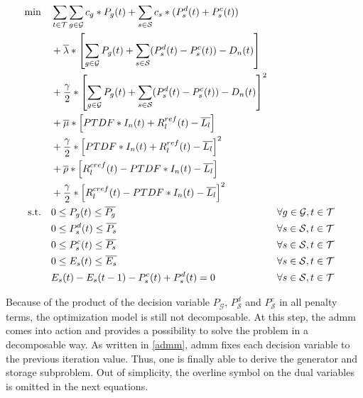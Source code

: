 \begin{subequations}
	\begin{align}
		 \min \quad & \sum_{t\in\mathcal{T}}\sum_{g\in\mathcal{G}}c_g*P_g(t) + \sum_{s\in\mathcal{S}}c_s*(P_s^d(t)+P_s^c(t)) \label{eq:dom:final} \\
		 & + \overline{\lambda} * \left[\sum_{g\in\mathcal{G}}P_g(t) + \sum_{s\in\mathcal{S}}(P_s^d(t)-P_s^c(t))-D_n(t)\right]\nonumber \\
		 & + \frac{\gamma}{2} * \left[\sum_{g\in\mathcal{G}}P_g(t) + \sum_{s\in\mathcal{S}}(P_s^d(t)-P_s^c(t))-D_n(t)\right]^2 \nonumber \\
		 & + \overline{\mu} * \left[PTDF * I_n(t) + R^{ref}_l(t) - \overline{L_l}\right] \nonumber \\
		 & + \frac{\gamma}{2} * \left[PTDF * I_n(t) + R^{ref}_l(t) - \overline{L_l}\right]^2 \nonumber \\
		 & + \overline{\rho} * \left[R^{cref}_l(t) - PTDF * I_n(t) - \overline{L_l}\right]\nonumber \\
		 & + \frac{\gamma}{2} * \left[R^{cref}_l(t) - PTDF * I_n(t) - \overline{L_l}\right]^2\nonumber \\
		 \text{s.t.} \quad & 0 \leq P_g(t) \leq \overline{P_g} && \forall g \in \mathcal{G}, t \in \mathcal{T}\\\
		 & 0 \leq P_s^d(t) \leq \overline{P_s} && \forall s \in \mathcal{S}, t \in \mathcal{T}\\
		 & 0 \leq P_s^c(t) \leq \overline{P_s} && \forall s \in \mathcal{S}, t \in \mathcal{T}\\
		 & 0 \leq E_s(t) \leq \overline{E_s} && \forall s \in \mathcal{S}, t \in \mathcal{T}\\
		 & E_s(t) - E_s(t-1) - P_s^c(t) + P_s^d(t) = 0 && \forall s \in \mathcal{S}, t \in \mathcal{T}
	\end{align}
\end{subequations}

Because of the product of the decision variable $P_{\mathcal{G}}$, $P_{\mathcal{S}}^d$ and $P_{\mathcal{S}}^c$ in all penalty terms, the optimization model is still not decomposable. At this step, the \gls{admm} comes into action and provides a possibility to solve the problem in a decomposable way. As written in \ref{admm}, \gls{admm} fixes each decision variable to the previous iteration value. Thus, one is finally able to derive the generator and storage subproblem. Out of simplicity, the overline symbol on the dual variables is omitted in the next equations.


